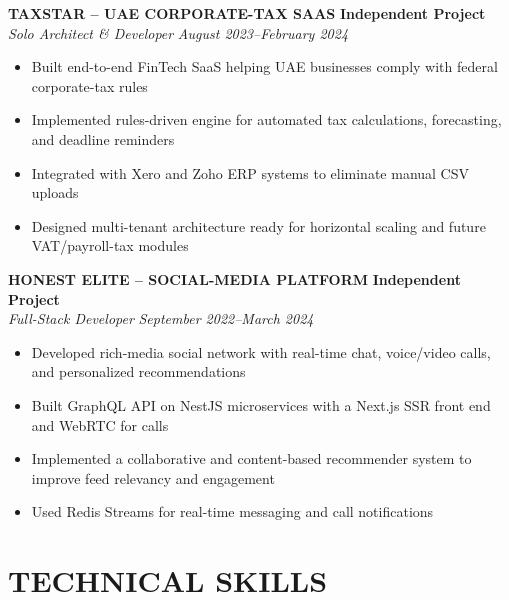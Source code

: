 \documentclass[11pt,letterpaper]{article}
\newcommand{\role}[4]{
  \begin{center}
  \textbf{#1} \hfill \textbf{#2} \\
  \textit{#3} \hfill \textit{#4}
  \end{center}
}
\begin{document}
\role{TAXSTAR -- UAE CORPORATE-TAX SAAS}{Independent Project}{Solo Architect \& Developer}{August 2023--February 2024}
\begin{itemize}[leftmargin=*,nosep,topsep=0pt]
  \item Built end-to-end FinTech SaaS helping UAE businesses comply with federal corporate-tax rules
  \item Implemented rules-driven engine for automated tax calculations, forecasting, and deadline reminders
  \item Integrated with Xero and Zoho ERP systems to eliminate manual CSV uploads
  \item Designed multi-tenant architecture ready for horizontal scaling and future VAT/payroll-tax modules
\end{itemize}

\role{HONEST ELITE -- SOCIAL-MEDIA PLATFORM}{Independent Project}{Full-Stack Developer}{September 2022--March 2024}
\begin{itemize}[leftmargin=*,nosep,topsep=0pt]
  \item Developed rich-media social network with real-time chat, voice/video calls, and personalized recommendations
  \item Built GraphQL API on NestJS microservices with a Next.js SSR front end and WebRTC for calls
  \item Implemented a collaborative and content-based recommender system to improve feed relevancy and engagement
  \item Used Redis Streams for real-time messaging and call notifications
\end{itemize}

\vspace{1em}
\section{TECHNICAL SKILLS}
\end{document}
